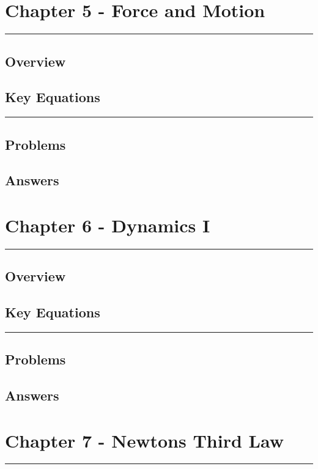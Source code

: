 \documentclass[a4paper,12pt]{article}
\begin{document}
\pagebreak
\section*{Chapter 5 - Force and Motion}
\rule{\linewidth}{1pt}
\subsection*{Overview}
\subsection*{Key Equations}

\begin{center}
  \rule{6cm}{0.5pt}
\end{center}
\subsection*{Problems}
\subsection*{Answers}

\pagebreak
\section*{Chapter 6 - Dynamics I}
\rule{\linewidth}{1pt}
\subsection*{Overview}
\subsection*{Key Equations}

\begin{center}
  \rule{6cm}{0.5pt}
\end{center}
\subsection*{Problems}
\subsection*{Answers}

\pagebreak
\section*{Chapter 7 - Newtons Third Law}
\rule{\linewidth}{1pt}
\end{document}

